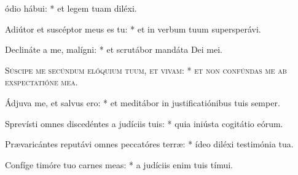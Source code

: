 \begin{psalmus}

 ódio hábui: * et legem tuam diléxi.

Adiútor et suscéptor meus es tu: * et in verbum tuum supersperávi.

Declináte a me, malígni: * et scrutábor mandáta Dei mei.

\textsc{Súscipe me secúndum elóquium tuum, et vivam: * et non confúndas me ab exspectatióne mea.}

Ádjuva me, et salvus ero: * et meditábor in justificatiónibus tuis semper.

Sprevísti omnes discedéntes a judíciis tuis: * quia iniústa cogitátio eórum.

Prævaricántes reputávi omnes peccatóres terræ: * ídeo diléxi testimónia tua.

Confíge timóre tuo carnes meas: * a judíciis enim tuis tímui.

\end{psalmus}
